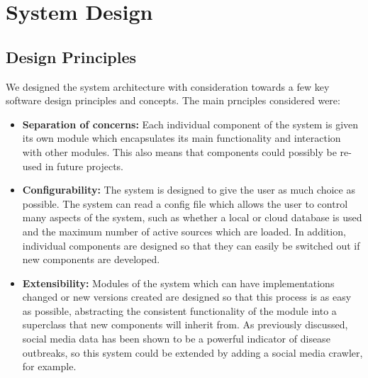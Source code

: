 \documentclass{l4proj}
\begin{document}


\chapter{System Design}
\section{Design Principles}
We designed the system architecture with consideration towards a few key software design principles and concepts. The main prnciples considered were:
\begin{itemize}
    \item \textbf{Separation of concerns: }Each individual component of the system is given its own module which encapsulates its main functionality and interaction with other modules. This also means that components could possibly be re-used in future projects.
    \item \textbf{Configurability: }The system is designed to give the user as much choice as possible. The system can read a config file which allows the user to control many aspects of the system, such as whether a local or cloud database is used and the maximum number of active sources which are loaded. In addition, individual components are designed so that they can easily be switched out if new components are developed.
    \item \textbf{Extensibility: }Modules of the system which can have implementations changed or new versions created are designed so that this process is as easy as possible, abstracting the consistent functionality of the module into a superclass that new components will inherit from. As previously discussed, social media data has been shown to be a powerful indicator of disease outbreaks, so this system could be extended by adding a social media crawler, for example.
\end{itemize}
\end{document}
